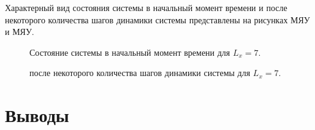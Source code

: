 \documentclass[14pt,a4paper,report]{ncc}
\begin{document}
Характерный вид состояния системы в начальный момент времени и после некоторого количества шагов динамики системы представлены на рисунках МЯУ и МЯУ. 
\
\begin{figure}[h]
\caption{Состояние системы в начальный момент времени для $L_x=7$.}
\label{ris:image}
\end{figure}

\begin{figure}[h]
\caption{после некоторого количества шагов динамики системы для $L_x=7$.}
\label{ris:image}
\end{figure}


\newpage\section{Выводы}
\end{document}
